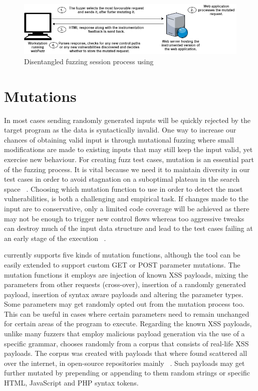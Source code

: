 \begin{figure}[ht]
 \centering
 \captionsetup{justification=centering}
 \includegraphics[width=5.2in]{figures/architecture.png}
 \caption{Disentangled fuzzing session process using \pname{}}
 \label{fig:architecture}
\end{figure}

\section{Mutations}
In most cases sending randomly generated inputs will be quickly rejected by the target program as the data is syntactically invalid. One way to increase our chances of obtaining valid input is through mutational fuzzing where small modifications are made to existing inputs that may still keep the input valid, yet exercise new behaviour. For creating fuzz test cases, mutation is an essential part of the fuzzing process. It is vital because we need it to maintain diversity in our test cases in order to avoid stagnation on a suboptimal plateau in the search space ~\cite{seal2016Genetic}. Choosing which mutation function to use in order to detect the most vulnerabilities, is both a challenging and empirical task. If changes made to the input are to conservative, only a limited code coverage will be achieved as there may not be enough to trigger new control flows whereas too aggressive tweaks can destroy much of the input data structure and lead to the test cases failing at an early stage of the execution ~\cite{zalewski2014Mutations}.

\pname{} currently supports five kinds of mutation functions, although the tool can be easily
extended to support custom GET or POST parameter mutations. The mutation functions it employs are injection of known XSS payloads, mixing the parameters from other requests (cross-over), insertion of a randomly generated payload, insertion of syntax aware payloads and altering the
parameter types. Some parameters may get randomly opted out from the mutation process too. This can be useful in cases where certain parameters need to remain unchanged for certain areas of the program to execute. Regarding the known XSS payloads, unlike many fuzzers that employ malicious payload generation via the use of a specific grammar, \pname{} chooses randomly from a corpus that consists of real-life XSS payloads. The corpus was created with payloads that where found scattered all over the internet, in open-source repositories mainly ~\cite{seclist,xsspayloadfirst,xsspayloadsecond}. Such payloads may get further mutated by prepending or appending to them random strings or specific HTML, JavaScript and PHP syntax tokens.

